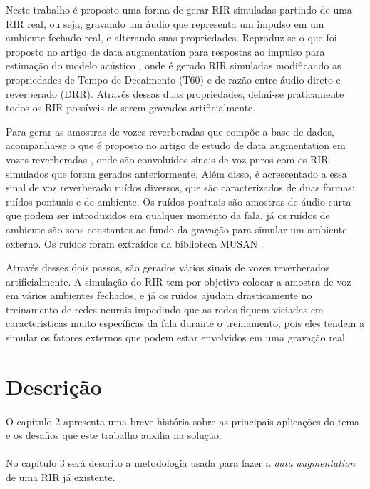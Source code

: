 Neste trabalho é proposto uma forma de gerar RIR simuladas partindo de uma RIR real, ou seja, gravando um áudio que representa um impulso em um ambiente
fechado real, e alterando suas propriedades. Reproduz-se o que foi proposto no artigo de data augmentation para respostas ao impulso para
estimação do modelo acústico \cite{RIR_Data_Aug}, onde é gerado RIR simuladas modificando as propriedades de Tempo de Decaimento (T60) e de
razão entre áudio direto e reverberado (DRR). Através dessas duas propriedades, defini-se praticamente todos os RIR possíveis de serem gravados
artificialmente.

Para gerar as amostras de vozes reverberadas que compõe a base de dados, acompanha-se o que é proposto no artigo de estudo de data
augmentation em vozes reverberadas \cite{Speech_Rec}, onde são convoluídos sinais de voz puros com os RIR simulados que foram gerados anteriormente.
Além disso, é acrescentado a essa sinal de voz reverberado ruídos diversos, que são caracterizados de duas formas: ruídos pontuais e de ambiente.
Os ruídos pontuais são amostras de áudio curta que podem ser introduzidos em qualquer momento da fala, já os ruídos de ambiente são sons constantes
ao fundo da gravação para simular um ambiente externo. Os ruídos foram extraídos da biblioteca MUSAN \cite{noiseLib}.

Através desses dois passos, são gerados vários sinais de vozes reverberados artificialmente. A simulação do RIR tem por objetivo colocar
a amostra de voz em vários ambientes fechados, e já os ruídos ajudam drasticamente no treinamento de redes neurais impedindo que as redes fiquem
viciadas em características muito específicas da fala durante o treinamento, pois eles tendem a simular os fatores externos que podem estar envolvidos em uma
gravação real.


\section{Descrição}

\paragraph{}O capítulo 2 apresenta uma breve história sobre as principais aplicações do tema e os desafios que este trabalho auxilia na solução.

\paragraph{}No capítulo 3 será descrito a metodologia usada para fazer a \textit{data augmentation} de uma RIR já existente.

